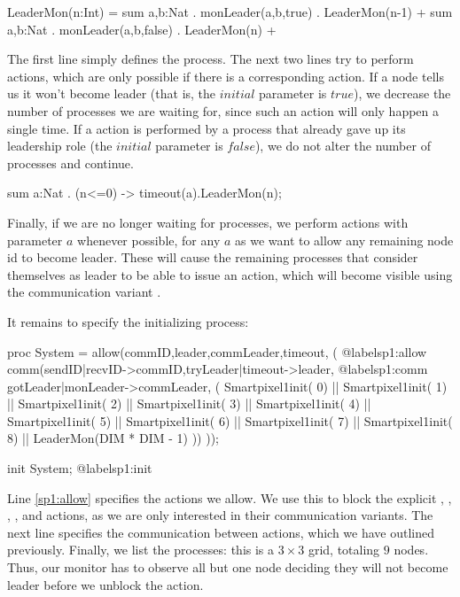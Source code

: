 \begin{codeverb}
LeaderMon(n:Int) =
 sum a,b:Nat . monLeader(a,b,true) . LeaderMon(n-1) +
 sum a,b:Nat . monLeader(a,b,false) . LeaderMon(n) +
\end{codeverb}

The first line simply defines the  process. The next two lines try to perform  actions, which are only possible if there is a corresponding  action. If a node tells us it won't become leader (that is, the $initial$ parameter is $true$), we decrease the number of processes we are waiting for, since such an action will only happen a single time. If a  action is performed by a process that already gave up its leadership role (the $initial$ parameter is $false$), we do not alter the number of processes and continue.

\begin{codeverb}
 sum a:Nat . (n<=0) -> timeout(a).LeaderMon(n);
\end{codeverb}

Finally, if we are no longer waiting for processes, we perform  actions with parameter $a$ whenever possible, for any $a$ as we want to allow any remaining node id to become leader. These will cause the remaining processes that consider themselves as leader to be able to issue an  action, which will become visible using the communication variant .

It remains to specify the initializing process:

\begin{codeverb}
proc    System =
         allow({commID,leader,commLeader,timeout}, ( @label{sp1:allow}
          comm(sendID|recvID->commID,tryLeader|timeout->leader, @label{sp1:comm}
           gotLeader|monLeader->commLeader, ( 
            Smartpixel1init( 0) || Smartpixel1init( 1) || Smartpixel1init( 2) ||
            Smartpixel1init( 3) || Smartpixel1init( 4) || Smartpixel1init( 5) ||
            Smartpixel1init( 6) || Smartpixel1init( 7) || Smartpixel1init( 8) ||
            LeaderMon(DIM * DIM - 1)
           ))
          ));

init    System; @label{sp1:init}
\end{codeverb}

Line \ref{sp1:allow} specifies the actions we allow. We use this to block the explicit , , , ,  and  actions, as we are only interested in their communication variants. The next line specifies the communication between actions, which we have outlined previously. Finally, we list the processes: this is a $3 \times 3$ grid, totaling $9$ nodes. Thus, our monitor has to observe all but one node deciding they will not become leader before we unblock the  action.

